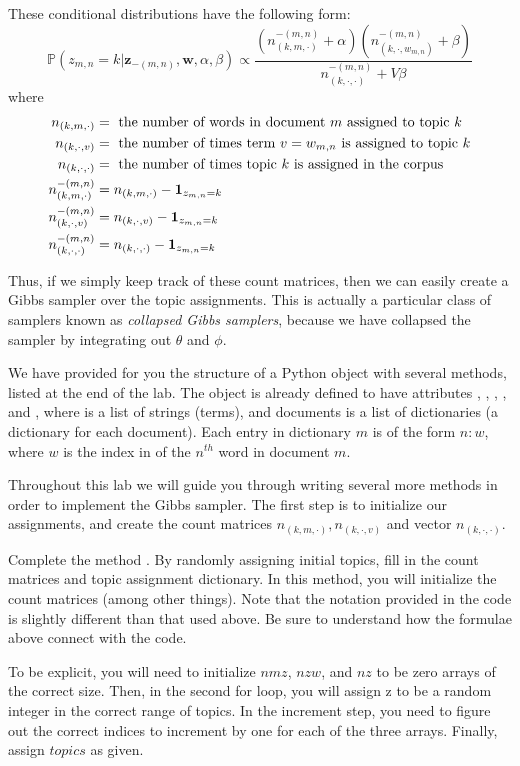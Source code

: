 These conditional distributions have the following form:
\begin{equation*}
\mathbb{P}(z_{m,n} = k | \mathbf{z}_{-(m,n)}, \mathbf{w}, \alpha, \beta) \propto \frac{(n_{(k,m,\cdot)}^{-(m,n)} + \alpha)(n_{(k, \cdot, w_{m,n})}^{-(m,n)} + \beta)}{n_{(k,\cdot,\cdot)}^{-(m,n)} + V \beta}
\end{equation*}
where
\begin{align*}
n_{(k,m,\cdot)} & = \mbox{ the number of words in document $m$ assigned to topic $k$} \\
n_{(k,\cdot,v)} & = \mbox{ the number of times term $v = w_{m,n}$ is assigned to topic $k$} \\
n_{(k,\cdot,\cdot)} & = \mbox{ the number of times topic $k$ is assigned in the corpus} \\
n_{(k,m,\cdot)}^{-(m,n)} & = n_{(k,m,\cdot)} - \boldsymbol{1}_{z_{m,n} = k} \\
n_{(k,\cdot,v)}^{-(m,n)} & = n_{(k,\cdot,v)} - \boldsymbol{1}_{z_{m,n} = k} \\
n_{(k,\cdot,\cdot)}^{-(m,n)} & = n_{(k,\cdot,\cdot)} - \boldsymbol{1}_{z_{m,n} = k}
\end{align*}

Thus, if we simply keep track of these count matrices, then we can easily create a Gibbs sampler over the topic assignments. This is actually a particular class of samplers known as \emph{collapsed Gibbs samplers}, because we have collapsed the sampler by integrating out $\theta$ and $\phi$.


We have provided for you the structure of a Python object  with several methods, listed at the end of the lab.
The object is already defined to have attributes , , , , and , where  is a list of strings (terms), and documents is a list of dictionaries (a dictionary for each document). Each entry in dictionary $m$ is of the form $n : w$, where $w$ is the index in  of the $n^{th}$ word in document $m$.

Throughout this lab we will guide you through writing several more methods in order to implement the Gibbs sampler. The first step is to initialize our assignments, and create the count matrices $n_{(k,m,\cdot)}, n_{(k,\cdot,v)}$ and vector $n_{(k,\cdot,\cdot)}$.

\begin{problem}
Complete the method .
By randomly assigning initial topics, fill in the count matrices and topic assignment dictionary. In this method, you will initialize the count matrices (among other things). Note that the notation
provided in the code is slightly different than that used above. Be sure to understand how the formulae above
connect with the code.

To be explicit, you will need to initialize $nmz$, $nzw$, and $nz$ to be zero arrays of the correct size.
Then, in the second for loop, you will assign z to be a random integer in the correct range of topics.
In the increment step, you need to figure out the correct indices to increment by one for each of the three arrays.
Finally, assign $topics$ as given.
\end{problem}

